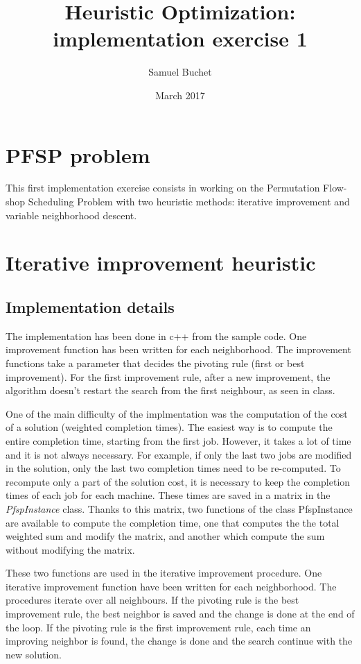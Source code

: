 \documentclass{article}
\title{Heuristic Optimization: implementation exercise 1}
\author{Samuel Buchet}
\date{March 2017}
\begin{document}
\maketitle

\section{PFSP problem}

This first implementation exercise consists in working on the Permutation Flow-shop Scheduling Problem with two heuristic methods: iterative improvement and variable neighborhood descent.

\section{Iterative improvement heuristic}

\subsection{Implementation details}

The implementation has been done in c++ from the sample code.
One improvement function has been written for each neighborhood.
The improvement functions take a parameter that decides the pivoting rule (first or best improvement).
For the first improvement rule, after a new improvement, the algorithm doesn't restart the search from the first neighbour, as seen in class. \newline

One of the main difficulty of the implmentation was the computation of the cost of a solution (weighted completion times). The easiest way is to compute the entire completion time, starting from the first job.
However, it takes a lot of time and it is not always necessary.
For example, if only the last two jobs are modified in the solution, only the last two completion times need to be re-computed.
To recompute only a part of the solution cost, it is necessary to keep the completion times of each job for each machine.
These times are saved in a matrix in the \textit{PfspInstance} class.
Thanks to this matrix, two functions of the class PfspInstance are available to compute the completion time, one that computes the the total weighted sum and modify the matrix, and another which compute the sum without modifying the matrix.\newline

These two functions are used in the iterative improvement procedure.
One iterative improvement function have been written for each neighborhood.
The procedures iterate over all neighbours.
If the pivoting rule is the best improvement rule, the best neighbor is saved and the change is done at the end of the loop.
If the pivoting rule is the first improvement rule, each time an improving neighbor is found, the change is done and the search continue with the new solution. \newline
\end{document}
